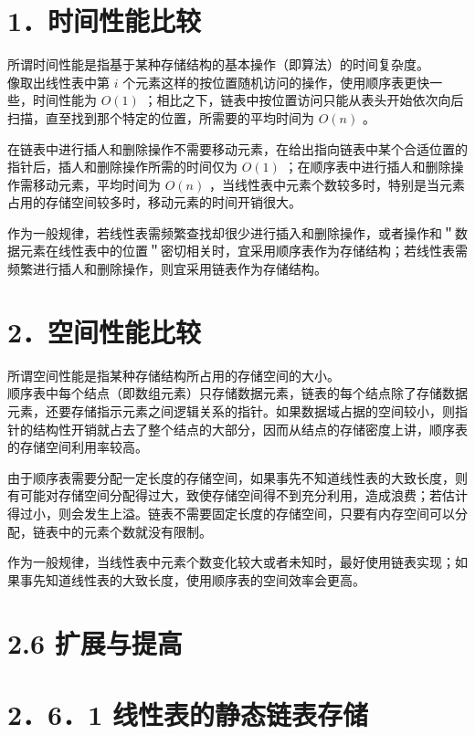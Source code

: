 \documentclass[10pt]{article}
\begin{document}
\section*{1．时间性能比较}
所谓时间性能是指基于某种存储结构的基本操作（即算法）的时间复杂度。\\
像取出线性表中第 $i$ 个元素这样的按位置随机访问的操作，使用顺序表更快一些，时间性能为 $O(1)$ ；相比之下，链表中按位置访问只能从表头开始依次向后扫描，直至找到那个特定的位置，所需要的平均时间为 $O(n)$ 。

在链表中进行插人和删除操作不需要移动元素，在给出指向链表中某个合适位置的指针后，插人和删除操作所需的时间仅为 $O(1)$ ；在顺序表中进行插人和删除操作需移动元素，平均时间为 $O(n)$ ，当线性表中元素个数较多时，特别是当元素占用的存储空间较多时，移动元素的时间开销很大。

作为一般规律，若线性表需频繁查找却很少进行插入和删除操作，或者操作和＂数据元素在线性表中的位置＂密切相关时，宜采用顺序表作为存储结构；若线性表需频繁进行插人和删除操作，则宜采用链表作为存储结构。

\section*{2．空间性能比较}
所谓空间性能是指某种存储结构所占用的存储空间的大小。\\
顺序表中每个结点（即数组元素）只存储数据元素，链表的每个结点除了存储数据元素，还要存储指示元素之间逻辑关系的指针。如果数据域占据的空间较小，则指针的结构性开销就占去了整个结点的大部分，因而从结点的存储密度上讲，顺序表的存储空间利用率较高。

由于顺序表需要分配一定长度的存储空间，如果事先不知道线性表的大致长度，则有可能对存储空间分配得过大，致使存储空间得不到充分利用，造成浪费；若估计得过小，则会发生上溢。链表不需要固定长度的存储空间，只要有内存空间可以分配，链表中的元素个数就没有限制。

作为一般规律，当线性表中元素个数变化较大或者未知时，最好使用链表实现；如果事先知道线性表的大致长度，使用顺序表的空间效率会更高。

\section*{2.6 扩展与提高}
\section*{2．6．1 线性表的静态链表存储}
\end{document}
